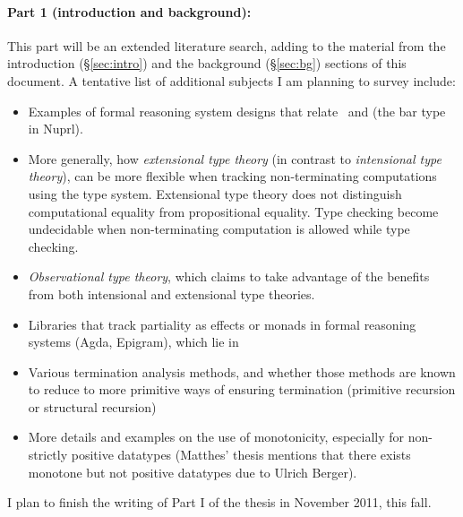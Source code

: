 \paragraph{Part 1 (introduction and background):}
This part will be an extended literature search, adding to the material from
the introduction (\S\ref{sec:intro}) and the background (\S\ref{sec:bg})
sections of this document. A tentative list of additional subjects I am
planning to survey include:
\begin{itemize}
\item Examples of formal reasoning system designs that relate
      \IND\ and \INDbot (\eg the bar type \cite{ConSmi93} in Nuprl).
\item More generally, how \emph{extensional type theory}
      (in contrast to \emph{intensional type theory}), can be more flexible
      when tracking non-terminating computations using the type system.
      Extensional type theory does not distinguish computational equality
      from propositional equality. Type checking become undecidable when
      non-terminating computation is allowed while type checking.
\item \emph{Observational type theory}, which claims to take advantage of
      the benefits from both intensional and extensional type theories.
\item Libraries that track partiality as effects or monads
      in formal reasoning systems (\eg Agda, Epigram), which lie in \IND
\item Various termination analysis methods, and whether those
      methods are known to reduce to more primitive ways of
      ensuring termination (\eg primitive recursion or structural recursion)
\item More details and examples on the use of monotonicity, especially for
      non-strictly positive datatypes
      (\eg Matthes' thesis mentions that there exists monotone but not positive
      datatypes due to Ulrich Berger).
\end{itemize}

I plan to finish the writing of Part I of the thesis in November 2011,
this fall.



